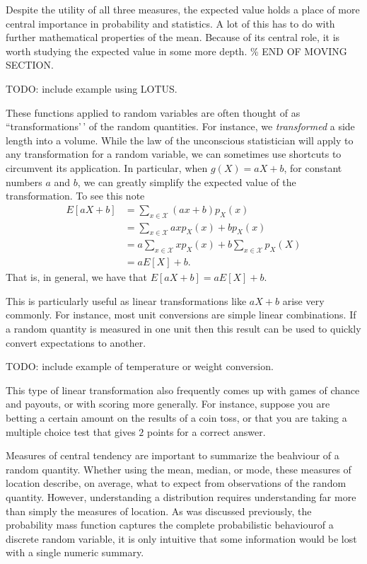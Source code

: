 \documentclass[
  letterpaper,
  DIV=11,
  numbers=noendperiod]{scrreprt}
\begin{document}
Despite the utility of all three measures, the expected value holds a
place of more central importance in probability and statistics. A lot of
this has to do with further mathematical properties of the mean. Because
of its central role, it is worth studying the expected value in some
more depth. \% END OF MOVING SECTION.

TODO: include example using LOTUS.

These functions applied to random variables are often thought of as
``transformations'\,' of the random quantities. For instance, we
\emph{transformed} a side length into a volume. While the law of the
unconscious statistician will apply to any transformation for a random
variable, we can sometimes use shortcuts to circumvent its application.
In particular, when \(g(X) = aX + b\), for constant numbers \(a\) and
\(b\), we can greatly simplify the expected value of the transformation.
To see this note \begin{align*}
E[aX + b] &= \sum_{x\in\mathcal{X}}(ax + b)p_X(x) \\
&= \sum_{x\in\mathcal{X}}axp_X(x) + bp_X(x) \\
&= a\sum_{x\in\mathcal{X}}xp_X(x) + b\sum_{x\in\mathcal{X}}p_X(X) \\
&= aE[X] + b.
\end{align*} That is, in general, we have that
\(E[aX + b] = aE[X] + b\).

This is particularly useful as linear transformations like \(aX+b\)
arise very commonly. For instance, most unit conversions are simple
linear combinations. If a random quantity is measured in one unit then
this result can be used to quickly convert expectations to another.

TODO: include example of temperature or weight conversion.

This type of linear transformation also frequently comes up with games
of chance and payouts, or with scoring more generally. For instance,
suppose you are betting a certain amount on the results of a coin toss,
or that you are taking a multiple choice test that gives \(2\) points
for a correct answer.

Measures of central tendency are important to summarize the beahviour of
a random quantity. Whether using the mean, median, or mode, these
measures of location describe, on average, what to expect from
observations of the random quantity. However, understanding a
distribution requires understanding far more than simply the measures of
location. As was discussed previously, the probability mass function
captures the complete probabilistic behaviourof a discrete random
variable, it is only intuitive that some information would be lost with
a single numeric summary.
\end{document}
